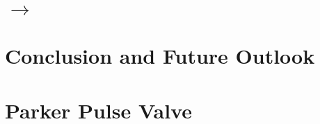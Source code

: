 \documentclass [PhD,nolistoftables,scheader] {uclathes}
\begin{document}
\chapter{ $\rightarrow$ \ce{[HCO+]}} \label{sec: [HCO]}

	

\chapter{Conclusion and Future Outlook}


\appendix

\chapter{Parker Pulse Valve}

\end{document}
